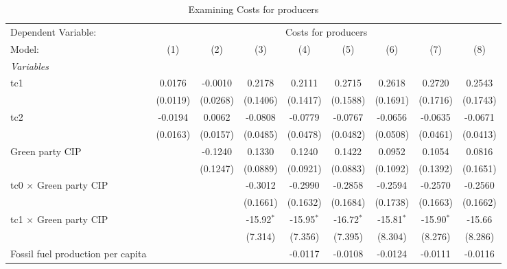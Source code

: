 
\begin{table}[htbp]
   \caption{Examining Costs for producers}
   \centering
   \begin{tabular}{lcccccccc}
      \tabularnewline \midrule \midrule
      Dependent Variable: & \multicolumn{8}{c}{Costs for producers}\\
      Model:                                  & (1)      & (2)      & (3)          & (4)          & (5)          & (6)          & (7)          & (8)\\  
      \midrule
      \emph{Variables}\\
      tc1                                     & 0.0176   & -0.0010  & 0.2178       & 0.2111       & 0.2715       & 0.2618       & 0.2720       & 0.2543\\   
                                              & (0.0119) & (0.0268) & (0.1406)     & (0.1417)     & (0.1588)     & (0.1691)     & (0.1716)     & (0.1743)\\   
      tc2                                     & -0.0194  & 0.0062   & -0.0808      & -0.0779      & -0.0767      & -0.0656      & -0.0635      & -0.0671\\   
                                              & (0.0163) & (0.0157) & (0.0485)     & (0.0478)     & (0.0482)     & (0.0508)     & (0.0461)     & (0.0413)\\   
      Green party CIP                         &          & -0.1240  & 0.1330       & 0.1240       & 0.1422       & 0.0952       & 0.1054       & 0.0816\\   
                                              &          & (0.1247) & (0.0889)     & (0.0921)     & (0.0883)     & (0.1092)     & (0.1392)     & (0.1651)\\   
      tc0 $\times$ Green party CIP            &          &          & -0.3012      & -0.2990      & -0.2858      & -0.2594      & -0.2570      & -0.2560\\   
                                              &          &          & (0.1661)     & (0.1632)     & (0.1684)     & (0.1738)     & (0.1663)     & (0.1662)\\   
      tc1 $\times$ Green party CIP            &          &          & -15.92$^{*}$ & -15.95$^{*}$ & -16.72$^{*}$ & -15.81$^{*}$ & -15.90$^{*}$ & -15.66\\   
                                              &          &          & (7.314)      & (7.356)      & (7.395)      & (8.304)      & (8.276)      & (8.286)\\   
      Fossil fuel production per capita       &          &          &              & -0.0117      & -0.0108      & -0.0124      & -0.0111      & -0.0116\\   

\end{tabular}
\end{table}
